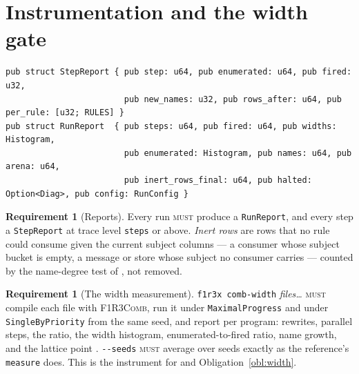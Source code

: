 \documentclass[11pt,a4paper]{article}
\newcommand{\code}[1]{\texttt{#1}}
\newcommand{\Comb}{\textsc{F1R3Comb}}
\newcommand{\MUST}{\textsc{must}}
\theoremstyle{definition}
\newtheorem{requirement}[definition]{Requirement}
\theoremstyle{plain}
\begin{document}
\section{Instrumentation and the width gate}\label{sec:instr}

\begin{lstlisting}
pub struct StepReport { pub step: u64, pub enumerated: u64, pub fired: u32,
                        pub new_names: u32, pub rows_after: u64, pub per_rule: [u32; RULES] }
pub struct RunReport  { pub steps: u64, pub fired: u64, pub widths: Histogram,
                        pub enumerated: Histogram, pub names: u64, pub arena: u64,
                        pub inert_rows_final: u64, pub halted: Option<Diag>, pub config: RunConfig }
\end{lstlisting}

\begin{requirement}[Reports]\label{req:reports}
Every run \MUST{} produce a \code{RunReport}, and every step a
\code{StepReport} at trace level \code{steps} or above. \emph{Inert rows}
are rows that no rule could consume given the current subject columns --- a
consumer whose subject bucket is empty, a message or store whose subject no
consumer carries --- counted by the name-degree test of
\cite[Obl.~13.3]{matnote}, not removed.
\end{requirement}

\begin{requirement}[The width measurement]\label{req:widthcmd}
\code{f1r3x comb-width} \emph{files\dots} \MUST{} compile each file with
\Comb, run it under \code{MaximalProgress} and under \code{SingleByPriority}
from the same seed, and report per program: rewrites, parallel steps, the
ratio, the width histogram, enumerated-to-fired ratio, name growth, and the
lattice point \cite[Req.~9.1]{combspec}. \code{-{}-seeds} \MUST{} average over
seeds exactly as the reference's \code{measure} does. This is the instrument
for \cite[P2]{matnote} and Obligation~\ref{obl:width}.
\end{requirement}
\end{document}
